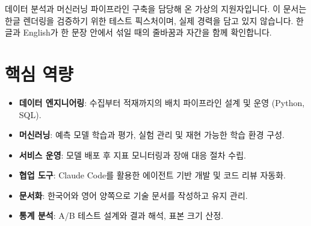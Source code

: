 \documentclass[11pt,a4paper,sans]{moderncv}
\begin{document}
\makecvtitle


\vspace{6pt}
\small{데이터 분석과 머신러닝 파이프라인 구축을 담당해 온 가상의 지원자입니다. 이 문서는 한글 렌더링을 검증하기 위한 테스트 픽스처이며, 실제 경력을 담고 있지 않습니다. 한글과 English가 한 문장 안에서 섞일 때의 줄바꿈과 자간을 함께 확인합니다.}


\section{핵심 역량}
\vspace{1pt}
\begin{itemize}

\item \textbf{데이터 엔지니어링}: 수집부터 적재까지의 배치 파이프라인 설계 및 운영 (Python, SQL).

\item \textbf{머신러닝}: 예측 모델 학습과 평가, 실험 관리 및 재현 가능한 학습 환경 구성.

\item \textbf{서비스 운영}: 모델 배포 후 지표 모니터링과 장애 대응 절차 수립.

\item \textbf{협업 도구}: Claude Code를 활용한 에이전트 기반 개발 및 코드 리뷰 자동화.

\item \textbf{문서화}: 한국어와 영어 양쪽으로 기술 문서를 작성하고 유지 관리.

\item \textbf{통계 분석}: A/B 테스트 설계와 결과 해석, 표본 크기 산정.

\end{itemize}

\end{document}
